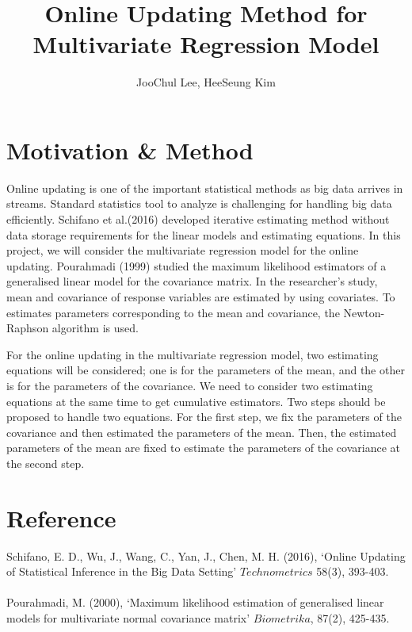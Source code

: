 \documentclass[12pt, leqno]{article}
\theoremstyle{plain}
\theoremstyle{definition}
\begin{document}
\iffalse%

\fi%

\title{Online Updating Method for Multivariate Regression Model}
\author{{\sc JooChul Lee, HeeSeung Kim}}
\date{}
\maketitle
\section{Motivation \& Method}
Online updating is one of the important statistical methods as big data arrives in streams. Standard statistics tool to analyze is challenging for handling big data efficiently. Schifano et al.(2016) developed iterative estimating method without data storage requirements for the linear models and estimating equations. In this project, we will consider the multivariate regression model for the online updating. Pourahmadi (1999) studied the maximum likelihood estimators of a generalised linear model for the covariance matrix. In the researcher's study, mean and covariance of response variables are estimated by using covariates. To estimates parameters corresponding to the mean and covariance, the Newton-Raphson algorithm is used. 

For the online updating in the multivariate regression model, two estimating equations will be considered; one is for the parameters of the mean, and the other is for the parameters of the covariance. We need to consider two estimating equations at the same time to get cumulative estimators. Two steps should be proposed to handle two equations. For the first step, we fix the parameters of the covariance and then estimated the parameters of the mean. Then, the estimated parameters of the mean are fixed to estimate the parameters of the covariance at the second step.
\\
\section{Reference}
Schifano, E. D., Wu, J., Wang, C., Yan, J.,  Chen, M. H. (2016), `Online Updating of Statistical Inference in the Big Data Setting'  $Technometrics$  58(3), 393-403. \\ \\
Pourahmadi, M. (2000), `Maximum likelihood estimation of generalised linear models for multivariate normal covariance matrix' $Biometrika$, 87(2), 425-435.
\end{document}
